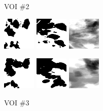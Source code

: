 \documentclass[journal]{IEEEtran}
\begin{document}
\begin{figure}[!htb]
  {\fontsize{9}{9}\selectfont VOI \#2} \vspace{1mm}

  \includegraphics[width=0.14\textwidth]
  {figure/all/dataset_7/roi_coronal}
  \includegraphics[width=0.14\textwidth]
  {figure/all/dataset_7/roi_saggital}
  \includegraphics[width=0.14\textwidth]
  {figure/all/dataset_7/proj_roi}

  \includegraphics[width=0.14\textwidth]
  {figure/all/dataset_7/model_coronal}
  \includegraphics[width=0.14\textwidth]
  {figure/all/dataset_7/model_saggital}
  \includegraphics[width=0.14\textwidth]
  {figure/all/dataset_7/proj_roi_inten10}

  {\fontsize{9}{9}\selectfont VOI \#3} \vspace{1mm}


\end{figure}
\end{document}
